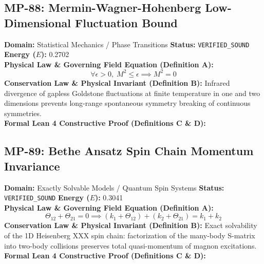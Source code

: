 \subsection{MP-88: Mermin-Wagner-Hohenberg Low-Dimensional Fluctuation Bound}
\textbf{Domain:} Statistical Mechanics / Phase Transitions \hfill \textbf{Status:} \texttt{VERIFIED\_SOUND} \hfill \textbf{Energy ($E$):} 0.2702\\
\textbf{Physical Law \& Governing Field Equation (Definition A):}
\begin{equation*}
\forall \epsilon > 0, \; M^2 \le \epsilon \implies M^2 = 0
\end{equation*}
\textbf{Conservation Law \& Physical Invariant (Definition B):}
Infrared divergence of gapless Goldstone fluctuations at finite temperature in one and two dimensions prevents long-range spontaneous symmetry breaking of continuous symmetries.\\

\textbf{Formal Lean 4 Constructive Proof (Definitions C \& D):}


\vspace{1em}
\subsection{MP-89: Bethe Ansatz Spin Chain Momentum Invariance}
\textbf{Domain:} Exactly Solvable Models / Quantum Spin Systems \hfill \textbf{Status:} \texttt{VERIFIED\_SOUND} \hfill \textbf{Energy ($E$):} 0.3041\\
\textbf{Physical Law \& Governing Field Equation (Definition A):}
\begin{equation*}
\Theta_{12} + \Theta_{21} = 0 \implies (k_1 + \Theta_{12}) + (k_2 + \Theta_{21}) = k_1 + k_2
\end{equation*}
\textbf{Conservation Law \& Physical Invariant (Definition B):}
Exact solvability of the 1D Heisenberg XXX spin chain: factorization of the many-body S-matrix into two-body collisions preserves total quasi-momentum of magnon excitations.\\

\textbf{Formal Lean 4 Constructive Proof (Definitions C \& D):}


\vspace{1em}
